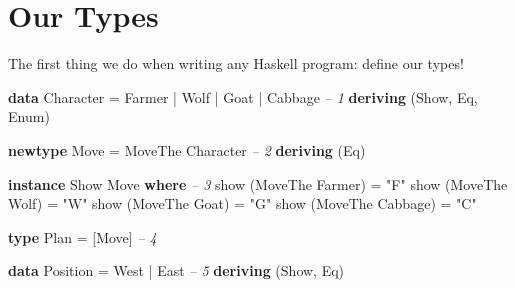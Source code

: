\documentclass[]{article}
\newenvironment{Shaded}{}{}
\newcommand{\KeywordTok}[1]{\textcolor[rgb]{0.00,0.44,0.13}{\textbf{{#1}}}}
\newcommand{\DataTypeTok}[1]{\textcolor[rgb]{0.56,0.13,0.00}{{#1}}}
\newcommand{\StringTok}[1]{\textcolor[rgb]{0.25,0.44,0.63}{{#1}}}
\newcommand{\CommentTok}[1]{\textcolor[rgb]{0.38,0.63,0.69}{\textit{{#1}}}}
\newcommand{\FunctionTok}[1]{\textcolor[rgb]{0.02,0.16,0.49}{{#1}}}
\newcommand{\NormalTok}[1]{{#1}}
\begin{document}
\section{Our Types}\label{our-types}

The first thing we do when writing any Haskell program: define our
types!

\begin{Shaded}
\begin{Highlighting}[]
\KeywordTok{data} \DataTypeTok{Character} \FunctionTok{=} \DataTypeTok{Farmer} \FunctionTok{|} \DataTypeTok{Wolf} \FunctionTok{|} \DataTypeTok{Goat} \FunctionTok{|} \DataTypeTok{Cabbage} \CommentTok{-- 1}
        \KeywordTok{deriving} \NormalTok{(}\DataTypeTok{Show}\NormalTok{, }\DataTypeTok{Eq}\NormalTok{, }\DataTypeTok{Enum}\NormalTok{)}

\KeywordTok{newtype} \DataTypeTok{Move} \FunctionTok{=} \DataTypeTok{MoveThe} \DataTypeTok{Character}                \CommentTok{-- 2}
        \KeywordTok{deriving} \NormalTok{(}\DataTypeTok{Eq}\NormalTok{)}

\KeywordTok{instance} \DataTypeTok{Show} \DataTypeTok{Move} \KeywordTok{where}                        \CommentTok{-- 3}
    \NormalTok{show (}\DataTypeTok{MoveThe} \DataTypeTok{Farmer}\NormalTok{)  }\FunctionTok{=} \StringTok{"F"}
    \NormalTok{show (}\DataTypeTok{MoveThe} \DataTypeTok{Wolf}\NormalTok{)    }\FunctionTok{=} \StringTok{"W"}
    \NormalTok{show (}\DataTypeTok{MoveThe} \DataTypeTok{Goat}\NormalTok{)    }\FunctionTok{=} \StringTok{"G"}
    \NormalTok{show (}\DataTypeTok{MoveThe} \DataTypeTok{Cabbage}\NormalTok{) }\FunctionTok{=} \StringTok{"C"}

\KeywordTok{type} \DataTypeTok{Plan} \FunctionTok{=} \NormalTok{[}\DataTypeTok{Move}\NormalTok{]                              }\CommentTok{-- 4}

\KeywordTok{data} \DataTypeTok{Position} \FunctionTok{=} \DataTypeTok{West} \FunctionTok{|} \DataTypeTok{East}                     \CommentTok{-- 5}
    \KeywordTok{deriving} \NormalTok{(}\DataTypeTok{Show}\NormalTok{, }\DataTypeTok{Eq}\NormalTok{)}
\end{Highlighting}
\end{Shaded}
\end{document}
